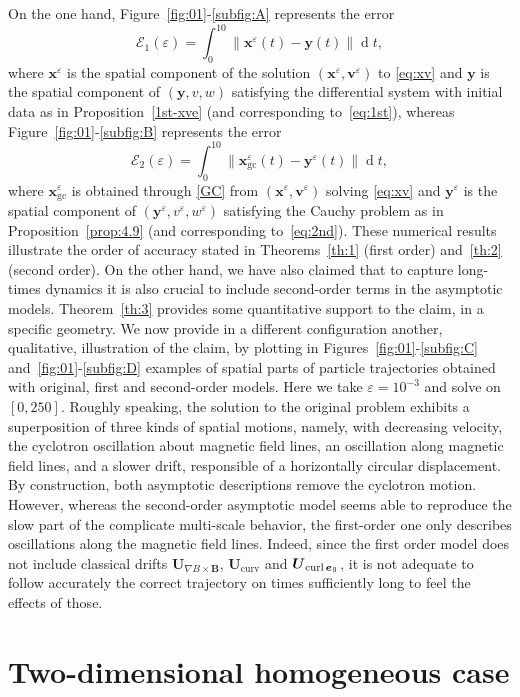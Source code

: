 \documentclass[JEP,XML,SOM,Unicode]{cedram}
\let\mathcal\mathscr
\newcounter{subfig}
\let\eps\varepsilon
\DeclareMathOperator\dD{d}\let\dd\dD
\DeclareMathOperator{\Curl}{curl}
\theoremstyle{plain}
\theoremstyle{definition}
\newcommand\bB{{\boldsymbol B}}
\newcommand\bU{{\boldsymbol U}}
\newcommand\bfv{{\boldsymbol v}}
\newcommand\bfx{{\boldsymbol x}}
\newcommand\bfy{{\boldsymbol y}}
\newcommand\cE{{\mathcal E}}
\DeclareMathOperator{\beD}{\boldsymbol{e}}
\newcommand\eDpar{\beD_\mypar}
\let\e w
\newcommand{\GC}{\bfx_\mathrm{gc}}
\newcommand{\gradB}{\bU_{\nabla B\times\bB}}
\newcommand{\curvB}{\bU_{\mathrm{curv}}}
\newcommand{\rotB}{\bU_{\Curl\eDpar}}
\newcommand{\mypar}{{\mkern3mu\vphantom{\perp}\vrule depth 0pt\mkern2mu\vrule depth 0pt\mkern3mu}}
\begin{document}
On the one hand, Figure~\ref{fig:01}-\eqref{subfig:A} represents the error
\[
\cE_1(\eps) = \int_0^{10} \| \bfx^\eps(t) - \bfy(t) \| \dD t,
\]
where $\bfx^\eps$ is the spatial component of the solution $(\bfx^\eps,\bfv^\eps)$ to \eqref{eq:xv} and $\bfy$ is the spatial component of $(\bfy,v,\e)$ satisfying the differential system with initial data as in Proposition~\ref{1st-xve} (and corresponding to~\eqref{eq:1st}), whereas Figure~\ref{fig:01}-\eqref{subfig:B} represents the error
\[
\cE_2(\eps) = \int_0^{10}\| \GC^\eps(t) - \bfy^\eps(t) \| \dD t,
\]
where $\GC^\eps$ is obtained through \eqref{GC} from $(\bfx^\eps,\bfv^\eps)$
solving \eqref{eq:xv} and $\bfy^\eps$ is the spatial component of $(\bfy^\eps,v^\eps,\e^\eps)$ satisfying the Cauchy problem as in Proposition~\ref{prop:4.9} (and corresponding to~\eqref{eq:2nd}). These numerical results illustrate the order of accuracy stated in Theorems~\ref{th:1} (first order) and~\ref{th:2} (second order). On the other hand, we have also claimed that to capture long-times dynamics it is also crucial to include second-order terms in the asymptotic models. Theorem~\ref{th:3} provides some quantitative support to the claim, in a specific geometry. We now provide in a different configuration another, qualitative, illustration of the claim, by plotting in Figures~\ref{fig:01}-\eqref{subfig:C} and~\ref{fig:01}-\eqref{subfig:D} examples of spatial parts of particle trajectories obtained with original, first and second-order models. Here we take $\eps=10^{-3}$ and solve on $[0,250]$. Roughly speaking, the solution to the original problem exhibits a superposition of three kinds of spatial motions, namely, with decreasing velocity, the cyclotron oscillation about magnetic field lines, an oscillation along magnetic field lines, and a slower drift, responsible of a horizontally circular displacement. By construction, both asymptotic descriptions remove the cyclotron motion. However, whereas the second-order asymptotic model seems able to reproduce the slow part of the complicate multi-scale behavior, the first-order one only describes oscillations along the magnetic field lines. Indeed, since the first order model does not include classical drifts $\gradB$, $\curvB$ and $\rotB$, it is not adequate to follow accurately the correct trajectory on times sufficiently long to feel the effects of those.

\section{Two-dimensional homogeneous case}\label{s:homogeneous}
\end{document}
